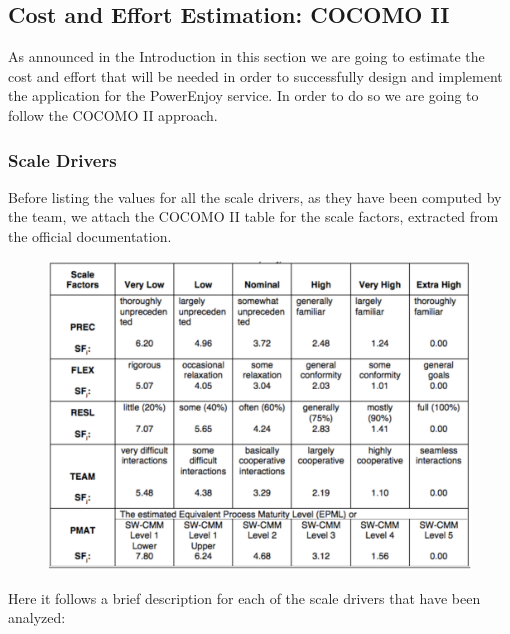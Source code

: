 \documentclass[a4paper,10pt]{article}
\begin{document}
  \subsection{Cost and Effort Estimation: COCOMO II}
  As announced in the Introduction in this section we are going to estimate the cost and effort that will be needed in order
  to successfully design and implement the application for the PowerEnjoy service. In order to do so we are going to follow the 
  COCOMO II approach.
  \FloatBarrier
  \subsubsection{Scale Drivers}
  Before listing the values for all the scale drivers, as they have been computed by the team, we attach the COCOMO II table for the scale 
  factors, extracted from the official documentation.
    \begin{figure}[h]
  \centering
    \includegraphics[scale=0.32]{Resources/cocomo/cocomo_ge.png}
  \end{figure}
  \FloatBarrier
  Here it follows a brief description for each of the scale drivers that have been analyzed:
\end{document}
